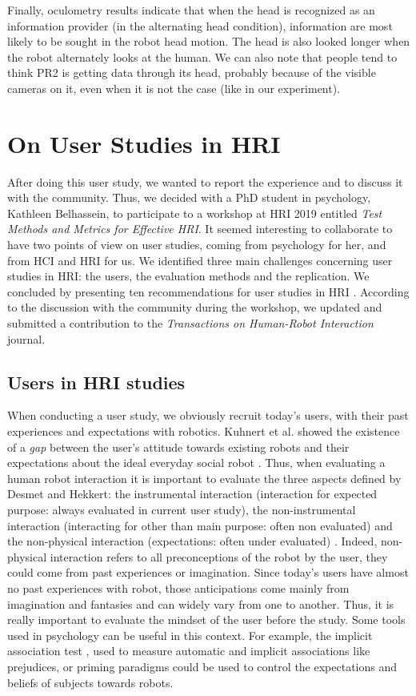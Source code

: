\documentclass[a4paper,11pt,twoside]{StyleThese}
\begin{document}
Finally, oculometry results indicate that when the head is recognized as an information provider (in the alternating head condition), information are most likely to be sought in the robot head motion. The head is also looked longer when the robot alternately looks at the human. We can also note that people tend to think PR2 is getting data through its head, probably because of the visible cameras on it, even when it is not the case (like in our experiment).


\section{On User Studies in HRI}
After doing this user study, we wanted to report the experience and to discuss it with the community. Thus, we decided with a PhD student in psychology, Kathleen Belhassein, to participate to a workshop at HRI 2019 entitled \textit{Test Methods and Metrics for Effective HRI}. It seemed interesting to collaborate to have two points of view on user studies, coming from psychology for her, and from HCI and HRI for us. We identified three main challenges concerning user studies in HRI: the users, the evaluation methods and the replication. We concluded by presenting ten recommendations for user studies in HRI \cite{belhassein2019towards}. According to the discussion with the community during the workshop, we updated and submitted a contribution to the \textit{Transactions on Human-Robot Interaction} journal.

\subsection{Users in HRI studies}
When conducting a user study, we obviously recruit today's users, with their past experiences and expectations with robotics. Kuhnert et al. showed the existence of a \textit{gap} between the user's attitude towards existing robots and their expectations about the  ideal everyday social robot \cite{kuhnert2017gap}. Thus, when evaluating a human robot interaction it is important to evaluate the three aspects defined by Desmet and Hekkert: the instrumental interaction (interaction for expected purpose: always evaluated in current user study), the non-instrumental interaction (interacting for other than main purpose: often non evaluated) and the non-physical interaction (expectations: often under evaluated) \cite{desmet2007framework}. Indeed, non-physical interaction refers to all preconceptions of the robot by the user, they could come from past experiences or imagination. Since today's users have almost no past experiences with robot, those anticipations come mainly from imagination and fantasies and can widely vary from one to another. Thus, it is really important to evaluate the mindset of the user before the study. Some tools used in psychology can be useful in this context. For example, the implicit association test \cite{greenwald1998measuring}, used to measure automatic and implicit associations like prejudices, or priming paradigms could be used to control the expectations and beliefs of subjects towards robots.
\end{document}
